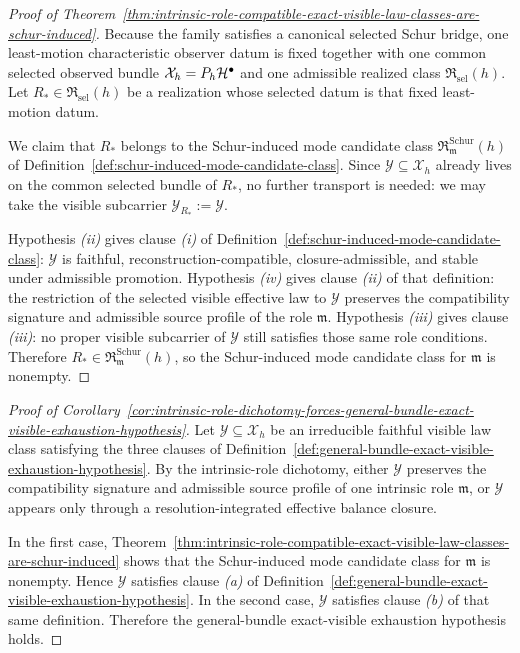 \begin{proof}[Proof of Theorem~\ref{thm:intrinsic-role-compatible-exact-visible-law-classes-are-schur-induced}]
\label{proof:thm:intrinsic-role-compatible-exact-visible-law-classes-are-schur-induced}
Because the family satisfies a canonical selected Schur bridge, one least-motion
characteristic observer datum is fixed together with one common selected
observed bundle \(\mathcal X_h=P_h\mathcal{H}^\bullet\) and one admissible realized
class \(\mathfrak R_{\mathrm{sel}}(h)\). Let \(R_\ast\in
\mathfrak R_{\mathrm{sel}}(h)\) be a realization whose selected datum is that
fixed least-motion datum.

We claim that \(R_\ast\) belongs to the Schur-induced mode candidate class
\(\mathfrak R^{\mathrm{Schur}}_{\mathfrak m}(h)\) of
Definition~\ref{def:schur-induced-mode-candidate-class}. Since
\(\mathcal Y\subseteq \mathcal X_h\) already lives on the common selected
bundle of \(R_\ast\), no further transport is needed: we may take the visible
subcarrier \(\mathcal Y_{R_\ast}:=\mathcal Y\).

Hypothesis \emph{(ii)} gives clause \emph{(i)} of
Definition~\ref{def:schur-induced-mode-candidate-class}: \(\mathcal Y\) is
faithful, reconstruction-compatible, closure-admissible, and stable under
admissible promotion. Hypothesis \emph{(iv)} gives clause \emph{(ii)} of that
definition: the restriction of the selected visible effective law to
\(\mathcal Y\) preserves the compatibility signature and admissible source
profile of the role \(\mathfrak m\). Hypothesis \emph{(iii)} gives clause
\emph{(iii)}: no proper visible subcarrier of \(\mathcal Y\) still satisfies
those same role conditions. Therefore \(R_\ast\in
\mathfrak R^{\mathrm{Schur}}_{\mathfrak m}(h)\), so the Schur-induced mode
candidate class for \(\mathfrak m\) is nonempty.
\end{proof}

\begin{proof}[Proof of Corollary~\ref{cor:intrinsic-role-dichotomy-forces-general-bundle-exact-visible-exhaustion-hypothesis}]
\label{proof:cor:intrinsic-role-dichotomy-forces-general-bundle-exact-visible-exhaustion-hypothesis}
Let \(\mathcal Y\subseteq \mathcal X_h\) be an irreducible faithful visible law
class satisfying the three clauses of
Definition~\ref{def:general-bundle-exact-visible-exhaustion-hypothesis}. By
the intrinsic-role dichotomy, either \(\mathcal Y\) preserves the
compatibility signature and admissible source profile of one intrinsic role
\(\mathfrak m\), or \(\mathcal Y\) appears only through a
resolution-integrated effective balance closure.

In the first case,
Theorem~\ref{thm:intrinsic-role-compatible-exact-visible-law-classes-are-schur-induced}
shows that the Schur-induced mode candidate class for \(\mathfrak m\) is
nonempty. Hence \(\mathcal Y\) satisfies clause \emph{(a)} of
Definition~\ref{def:general-bundle-exact-visible-exhaustion-hypothesis}. In the
second case, \(\mathcal Y\) satisfies clause \emph{(b)} of that same
definition. Therefore the general-bundle exact-visible exhaustion hypothesis
holds.
\end{proof}

